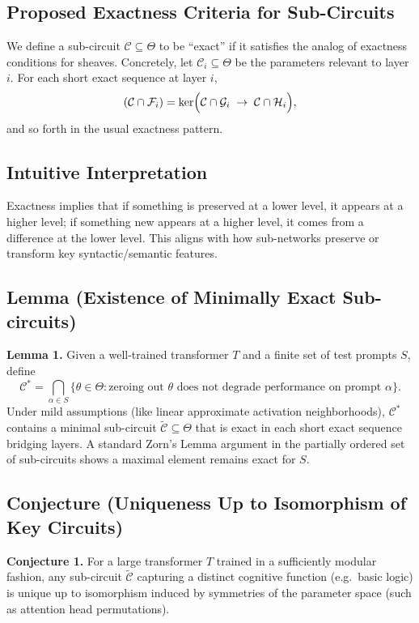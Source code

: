 \documentclass{article}
\begin{document}
\subsection{Proposed Exactness Criteria for Sub-Circuits}
We define a sub-circuit $\mathcal{C}\subseteq \Theta$ to be “exact” if it satisfies the analog of exactness conditions for sheaves. Concretely, let $\mathcal{C}_{i}\subseteq \Theta$ be the parameters relevant to layer $i$. For each short exact sequence at layer $i$,
\[
(\mathcal{C} \cap \mathcal{F}_i) = \ker\Bigl(\mathcal{C}\cap \mathcal{G}_i \;\to\; \mathcal{C}\cap \mathcal{H}_i\Bigr),
\]
and so forth in the usual exactness pattern.

\subsection{Intuitive Interpretation}
Exactness implies that if something is preserved at a lower level, it appears at a higher level; if something new appears at a higher level, it comes from a difference at the lower level. This aligns with how sub-networks preserve or transform key syntactic/semantic features.

\subsection{Lemma (Existence of Minimally Exact Sub-circuits)}
\textbf{Lemma 1.}  
Given a well-trained transformer $T$ and a finite set of test prompts $S$, define 
\[
\mathcal{C}^* = \bigcap_{\alpha \in S} \{\theta \in \Theta : \text{zeroing out }\theta\text{ does not degrade performance on prompt }\alpha\}.
\]
Under mild assumptions (like linear approximate activation neighborhoods), $\mathcal{C}^*$ contains a minimal sub-circuit $\widetilde{\mathcal{C}}\subseteq \Theta$ that is exact in each short exact sequence bridging layers. A standard Zorn’s Lemma argument in the partially ordered set of sub-circuits shows a maximal element remains exact for $S$.

\subsection{Conjecture (Uniqueness Up to Isomorphism of Key Circuits)}
\textbf{Conjecture 1.}  
For a large transformer $T$ trained in a sufficiently modular fashion, any sub-circuit $\widetilde{\mathcal{C}}$ capturing a distinct cognitive function (e.g.\ basic logic) is unique up to isomorphism induced by symmetries of the parameter space (such as attention head permutations).
\end{document}
